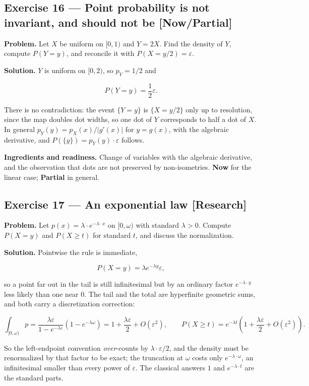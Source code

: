 \documentclass[11pt]{article}
\newcommand{\eps}{\varepsilon}
\renewcommand{\epsilon}{\varepsilon}
\begin{document}
\subsection*{Exercise 16 --- Point probability is not invariant, and should not be \hfill \normalfont\small[Now/Partial]}

\textbf{Problem.} Let $X$ be uniform on $[0,1)$ and $Y = 2X$. Find the density of
$Y$, compute $P(Y = y)$, and reconcile it with $P(X = y/2) = \eps$.

\textbf{Solution.} $Y$ is uniform on $[0,2)$, so $p_Y = 1/2$ and

\[
P(Y=y)=\frac12\epsilon .
\]

There is no contradiction: the event $\{Y = y\}$ is $\{X = y/2\}$ only up to
resolution, since the map doubles dot widths, so one dot of $Y$ corresponds to
half a dot of $X$. In general $p_Y(y) = p_X(x)/|g'(x)|$ for $y = g(x)$, with
the algebraic derivative, and $P(\{y\}) = p_Y(y)\cdot \eps$ follows.

\textbf{Ingredients and readiness.} Change of variables with the algebraic
derivative, and the observation that dots are not preserved by non-isometries.
\textbf{Now} for the linear case; \textbf{Partial} in general.


\subsection*{Exercise 17 --- An exponential law \hfill \normalfont\small[Research]}

\textbf{Problem.} Let $p(x) = \lambda\cdot e^{-\lambda\cdot x}$ on $[0, \omega)$ with standard
$\lambda > 0$. Compute $P(X = y)$ and $P(X \ge  t)$ for standard $t$, and discuss
the normalization.

\textbf{Solution.} Pointwise the rule is immediate,

\[
P(X=y)=\lambda e^{-\lambda y}\epsilon ,
\]

so a point far out in the tail is still infinitesimal but by an ordinary
factor $e^{-\lambda\cdot y}$ less likely than one near $0$. The tail and the total
are hyperfinite geometric sums, and both carry a discretization correction:

\[
\int_{[0,\omega)} p
=\frac{\lambda\epsilon}{1-e^{-\lambda\epsilon}}\left(1-e^{-\lambda\omega}\right)
=1+\frac{\lambda\epsilon}2+O(\epsilon^{2}),
\qquad
P(X\ge t)=e^{-\lambda t}\left(1+\frac{\lambda\epsilon}2+O(\epsilon^{2})\right).
\]

So the left-endpoint convention \emph{over}-counts by $\lambda\cdot \eps/2$, and the
density must be renormalized by that factor to be exact; the truncation at
$\omega$ costs only $e^{-\lambda\cdot \omega}$, an infinitesimal smaller than every
power of $\eps$. The classical answers $1$ and $e^{-\lambda\cdot t}$ are the
standard parts.
\end{document}
